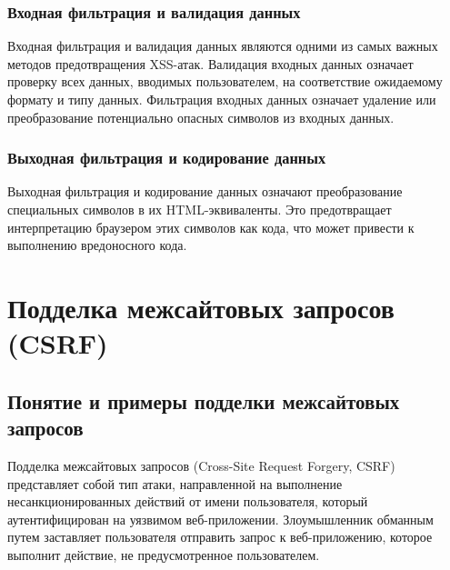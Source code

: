 \documentclass[a4paper,12pt]{diplom}
\begin{document}
	 \subsection{Входная фильтрация и валидация данных}
	 
	 Входная фильтрация и валидация данных являются одними из самых важных методов предотвращения XSS-атак. Валидация входных данных означает проверку всех данных, вводимых пользователем, на соответствие ожидаемому формату и типу данных. Фильтрация входных данных означает удаление или преобразование потенциально опасных символов из входных данных.
	 
	 \subsection{Выходная фильтрация и кодирование данных}
	 
	 Выходная фильтрация и кодирование данных означают преобразование специальных символов в их HTML-эквиваленты. Это предотвращает интерпретацию браузером этих символов как кода, что может привести к выполнению вредоносного кода. 
	 
	 
	 
	 
	 
	 
	 
	 
	 
	 
	 
	 
	 
	 
	 
	 
	 
	 
	 
	 
	 
	 
	 
	 
	 
	 
	 
	 
	 
	 
	 
	 
	 \chapter[Подделка межсайтовых запросов (CSRF)]{Подделка межсайтовых запросов (CSRF)}
	 
	 
	 \section{Понятие и примеры подделки межсайтовых запросов}
	 
	 Подделка межсайтовых запросов (Cross-Site Request Forgery, CSRF) представляет собой тип атаки, направленной на выполнение несанкционированных действий от имени пользователя, который аутентифицирован на уязвимом веб-приложении. Злоумышленник обманным путем заставляет пользователя отправить запрос к веб-приложению, которое выполнит действие, не предусмотренное пользователем.
	 
\end{document}
